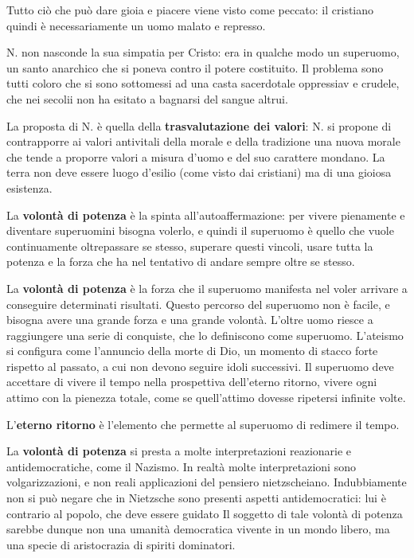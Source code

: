 \documentclass[a4paper, twoside, titlepage]{book}
\begin{document}
Tutto ciò che può dare gioia e piacere viene visto come peccato: il cristiano quindi è necessariamente un uomo malato e represso.

N. non nasconde la sua simpatia per Cristo: era in qualche modo un superuomo, un santo anarchico che si poneva contro il potere costituito. Il problema sono tutti coloro che si sono sottomessi ad una casta sacerdotale oppressiav e crudele, che nei secolii non ha esitato a bagnarsi del sangue altrui.

La proposta di N. è quella della \textbf{trasvalutazione dei valori}: N. si propone di contrapporre ai valori antivitali della morale e della tradizione una nuova morale che tende a proporre valori a misura d'uomo e del suo carattere mondano. La terra non deve essere luogo d'esilio (come visto dai cristiani) ma di una gioiosa esistenza.

La \textbf{volontà di potenza} è la spinta all'autoaffermazione: per vivere pienamente e diventare superuomini bisogna volerlo, e quindi il superuomo è quello che vuole continuamente oltrepassare se stesso, superare questi vincoli, usare tutta la potenza e la forza che ha nel tentativo di andare sempre oltre se stesso.

La \textbf{volontà di potenza} è la forza che il superuomo manifesta nel voler arrivare a conseguire determinati risultati. Questo percorso del superuomo non è facile, e bisogna avere una grande forza e una grande volontà.
L'oltre uomo riesce a raggiungere una serie di conquiste, che lo definiscono come superuomo.
L'ateismo si configura come l'annuncio della morte di Dio, un momento di stacco forte rispetto al passato, a cui non devono seguire idoli successivi. Il superuomo deve accettare di vivere il tempo nella prospettiva dell'eterno ritorno, vivere ogni attimo con la pienezza totale, come se quell'attimo dovesse ripetersi infinite volte.

L'\textbf{eterno ritorno} è l'elemento che permette al superuomo di redimere il tempo.

La \textbf{volontà di potenza} si presta a molte interpretazioni reazionarie e antidemocratiche, come il Nazismo. In realtà molte interpretazioni sono volgarizzazioni, e non reali applicazioni del pensiero nietzscheiano. Indubbiamente non si può negare che in Nietzsche sono presenti aspetti antidemocratici: lui è contrario al popolo, che deve essere guidato
Il soggetto di tale volontà di potenza sarebbe dunque non una umanità democratica vivente in un mondo libero, ma una specie di aristocrazia di spiriti dominatori.
\end{document}
